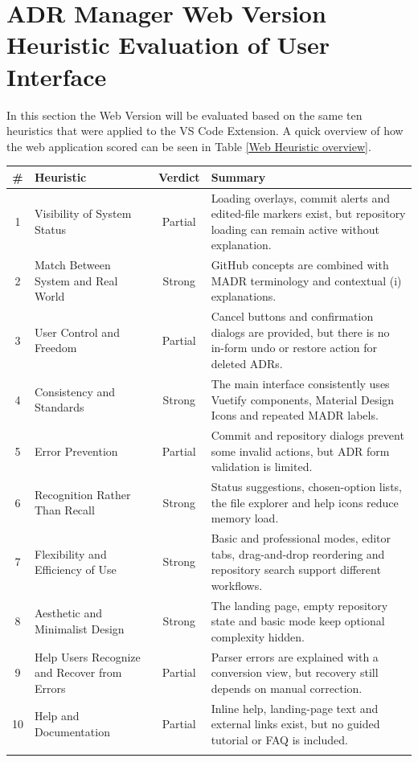 \documentclass{article}
\begin{document}
\section{ADR Manager Web Version Heuristic Evaluation of User Interface}
In this section the Web Version will be evaluated based on the same ten heuristics that were applied to the VS Code Extension. A quick overview of how the web application scored can be seen in Table \ref{Web Heuristic overview}.

\begin{tabular}{|c|p{4cm}|c|p{6cm}|}
\hline
\textbf{\#} & \textbf{Heuristic} & \textbf{Verdict} & \textbf{Summary} \\
\hline
1 & Visibility of System Status & Partial & Loading overlays, commit alerts and edited-file markers exist, but repository loading can remain active without explanation. \\
\hline
2 & Match Between System and Real World & Strong & GitHub concepts are combined with MADR terminology and contextual (i) explanations. \\
\hline
3 & User Control and Freedom & Partial & Cancel buttons and confirmation dialogs are provided, but there is no in-form undo or restore action for deleted ADRs. \\
\hline
4 & Consistency and Standards & Strong & The main interface consistently uses Vuetify components, Material Design Icons and repeated MADR labels. \\
\hline
5 & Error Prevention & Partial & Commit and repository dialogs prevent some invalid actions, but ADR form validation is limited. \\
\hline
6 & Recognition Rather Than Recall & Strong & Status suggestions, chosen-option lists, the file explorer and help icons reduce memory load. \\
\hline
7 & Flexibility and Efficiency of Use & Strong & Basic and professional modes, editor tabs, drag-and-drop reordering and repository search support different workflows. \\
\hline
8 & Aesthetic and Minimalist Design & Strong & The landing page, empty repository state and basic mode keep optional complexity hidden. \\
\hline
9 & Help Users Recognize and Recover from Errors & Partial & Parser errors are explained with a conversion view, but recovery still depends on manual correction. \\
\hline
10 & Help and Documentation & Partial & Inline help, landing-page text and external links exist, but no guided tutorial or FAQ is included. \\
\hline
\label{Web Heuristic overview}
\end{tabular}
\end{document}
